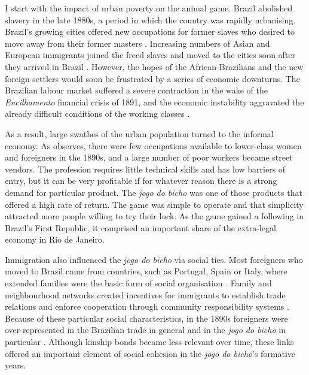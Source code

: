 \documentclass[a4paper,12pt]{article}
\begin{document}
I start with the impact of urban poverty on the animal game. Brazil abolished slavery in the late 1880s, a period in which the country was rapidly urbanising. Brazil's growing cities offered new occupations for former slaves who desired to move away from their former masters \citep{andrews1991blacks, skidmore1993black}. Increasing numbers of Asian and European immigrants joined the freed slaves and moved to the cities soon after they arrived in Brazil \citep{hall1969origins, lesser2013immigration}. However, the hopes of the African-Brazilians and the new foreign settlers would soon be frustrated by a series of economic downturns. The Brazilian labour market suffered a severe contraction in the wake of the \textit{Encilhamento} financial crisis of 1891, and the economic instability aggravated the already difficult conditions of the working classes \citep{topik2014political, triner2005baring}.

As a result, large swathes of the urban population turned to the informal economy. As \citet[115]{chazkel2011laws} observes, there were few occupations available to lower-class women and foreigners in the 1890s, and a large number of poor workers became street vendors. The profession requires little technical skills and has low barriers of entry, but it can be very profitable if for whatever reason there is a strong demand for particular product. The \textit{jogo do bicho} was one of those products that offered a high rate of return. The game was simple to operate and that simplicity attracted more people willing to try their luck. As the game gained a following in Brazil's First Republic, it comprised an important share of the extra-legal economy in Rio de Janeiro.

Immigration also influenced the \textit{jogo do bicho} via social ties. Most foreigners who moved to Brazil came from countries, such as Portugal, Spain or Italy, where extended families were the basic form of social organisation \citep{lobo2001imigraccao, trento1989outro}. Family and neighbourhood networks created incentives for immigrants to establish trade relations and enforce cooperation through community responsibility systems \citep{roth2014prison}. Because of these particular social characteristics, in the 1890s foreigners were over-represented in the Brazilian trade in general \citep{mattos1991vadios, oliveira2001brasil} and in the \textit{jogo do bicho} in particular \citep{magalhaes2005ganhou, villar2008contravencao}. Although kinship bonds became less relevant over time, these links offered an important element of social cohesion in the \textit{jogo do bicho}'s formative years.
\end{document}
